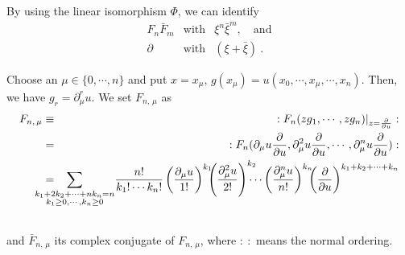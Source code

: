 \documentclass[makeidx,12pt,openany]{report}
\begin{document}
By using the linear isomorphism $\Phi $, 
we can identify
\begin{eqnarray}
 F_n \bar{F}_m &\mbox{with}& \xi^n \bar{\xi}^m, 
 \quad \mbox{and} \label{eqn:iden}\\
 \partial &\mbox{with}& (\xi+\bar{\xi}) \ .\nonumber
\end{eqnarray}

Choose an $\mu \in \{ 0,\cdots,n \}$ 
and put $x=x_{\mu}$, $g(x_{\mu})=u(x_0,\cdots,x_{\mu},\cdots,x_n)$.
Then, we have $g_r=\partial_{\mu}^r u$. 
We set $F_{n,\, \mu}$ as 
\begin{eqnarray}
F_{n,\, \mu} 
 & \equiv & :F_n(zg_1, \cdots ,zg_n)|_{z=\frac{\partial}{\partial u}}:\\
 &=&            :F_n(\partial_{\mu}u \frac{\partial}{\partial u},
                  \partial_{\mu}^2 u \frac{\partial}{\partial u},
                   \cdots ,
                  \partial_{\mu}^n u \frac{\partial}{\partial u}):\\
 &=& \hspace{-10mm}
    \sum_{{\scriptstyle k_1+2k_2+ \cdots +nk_n=n}\atop
          {\scriptstyle k_1 \geq 0,\cdots ,k_n \geq 0}} \hspace{-1mm}
         \frac{n!}{k_1! \cdots k_n!} 
         \left(
          \frac{\partial_{\mu}u}{1!}
         \right)^{k_1} \hspace{-2mm}
         \left(
          \frac{\partial_{\mu}^2 u}{2!}
         \right)^{k_2} \hspace{-3mm}
            \cdots
         \left(
          \frac{\partial_{\mu}^n u}{n!}
         \right)^{k_n} \hspace{-2mm}
         \left(
          \frac{\partial }{\partial u}
         \right)^{k_1+k_2+ \cdots +k_n}
         \nonumber \\
   && 
\end{eqnarray}
and $\bar{F}_{n,\, \mu}$ its complex conjugate of $F_{n,\, \mu}$, where $: \ :$  means the normal ordering.
\end{document}
